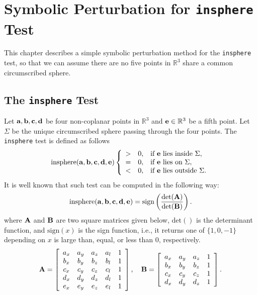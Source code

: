 \chapter{Symbolic Perturbation for {\tt insphere} Test}

This chapter describes a simple symbolic perturbation method for the {\tt insphere} test, so that we can assume there are no five points in $\mathbb{R}^3$ share a common circumscribed sphere. 

\section{The {\tt insphere} Test}

Let ${\bf a}, {\bf b}, {\bf c}, {\bf d}$ be four non-coplanar points in $\mathbb{R}^3$ and ${\bf e} \in \mathbb{R}^3$ be a fifth point.%
Let $\Sigma$ be the unique circumscribed sphere passing through the four points. The {\tt insphere} test is defined as follows
\begin{equation}
  \textrm{insphere}({\bf a}, {\bf b}, {\bf c}, {\bf d}, {\bf e})
  \left\{
  \begin{array}{ccl}
  > & 0, & \textrm{if ${\bf e}$ lies inside $\Sigma$},\\
  = & 0, & \textrm{if ${\bf e}$ lies on $\Sigma$},\\
  < & 0, & \textrm{if ${\bf e}$ lies outside $\Sigma$}.  
  \end{array}
  \right.
\end{equation}
It is well known that such test can be computed in the following way:
\begin{equation}\label{equ:insph}
 \textrm{insphere}({\bf a}, {\bf b}, {\bf c}, {\bf d}, {\bf e}) = \textrm{sign}\left(\frac{\textrm{det}({\bf A})}{\textrm{det}({\bf B})}\right).
\end{equation}
where ${\bf A}$ and ${\bf B}$ are two square matrices given below, $\textrm{det}()$ is the determinant function, and $\textrm{sign}(x)$ is the sign function, i.e., it returns one of $\{1, 0, -1\}$ depending on $x$ is large than, equal, or less than $0$, respectively.
\begin{equation}
  {\bf A} = \left[\begin{array}{ccccc}
      a_x & a_y & a_z & a_l & 1\\
      b_x & b_y & b_z & b_l & 1\\
      c_x & c_y & c_z & c_l & 1\\
      d_x & d_y & d_z & d_l & 1\\
      e_x & e_y & e_z & e_l & 1 
      \end{array}\right],
      \quad
  {\bf B} = \left[\begin{array}{cccc}
      a_x & a_y & a_z & 1\\
      b_x & b_y & b_z  & 1\\
      c_x & c_y & c_z  & 1\\
      d_x & d_y & d_z  & 1
      \end{array}\right].
\end{equation}
